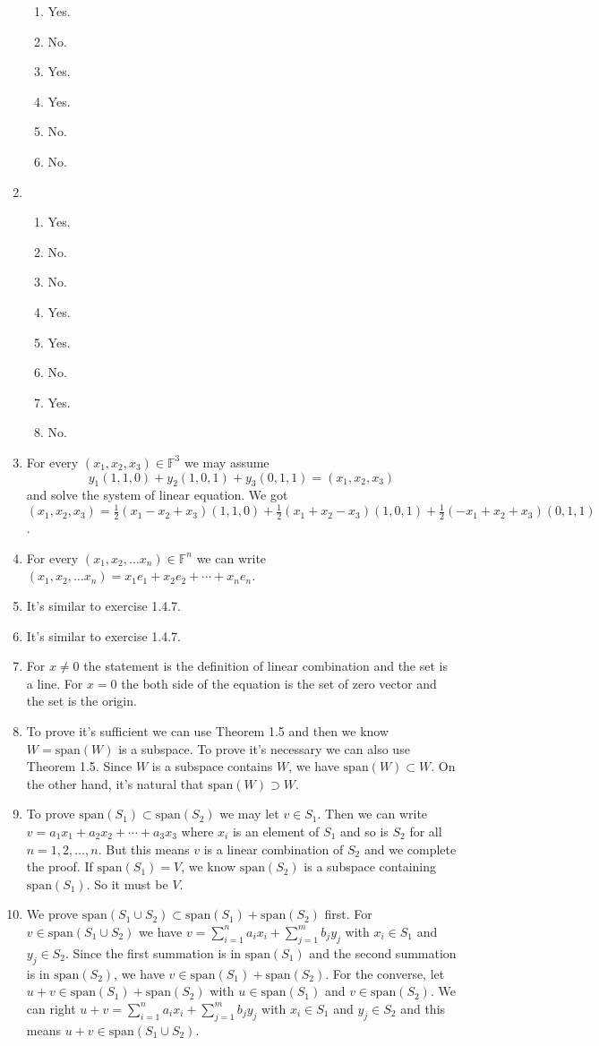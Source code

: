 \begin{enumerate}
\begin{enumerate}
\item Yes.
\item No.
\item Yes.
\item Yes.
\item No.
\item No.
\end{enumerate}
\item \begin{enumerate}
\item Yes.
\item No.
\item No.
\item Yes.
\item Yes.
\item No.
\item Yes.
\item No.
\end{enumerate}
\item For every $(x_1,x_2,x_3)\in \mathbb{F}^3$ we may assume \[y_1(1,1,0)+y_2(1,0,1)+y_3(0,1,1)=(x_1,x_2,x_3)\] and solve the system of linear equation. We got $(x_1,x_2,x_3)=\frac{1}{2}(x_1-x_2+x_3)(1,1,0)+\frac{1}{2}(x_1+x_2-x_3)(1,0,1)+\frac{1}{2}(-x_1+x_2+x_3)(0,1,1)$.
\item For every $(x_1,x_2,\dots x_n)\in \mathbb{F}^n$ we can write $(x_1,x_2,\dots x_n)=x_1e_1+x_2e_2+\cdots +x_ne_n$.
\item It's similar to exercise 1.4.7.
\item It's similar to exercise 1.4.7.
\item For $x\neq 0$ the statement is the definition of linear combination and the set is a line. For $x=0$ the both side of the equation is the set of zero vector and the set is the origin.
\item To prove it's sufficient we can use Theorem 1.5 and then we know $W=\mathrm{span}(W)$ is a subspace. To prove it's necessary we can also use Theorem 1.5. Since $W$ is a subspace contains $W$, we have $\mathrm{span}(W)\subset W$. On the other hand, it's natural that $\mathrm{span}(W)\supset W$.
\item To prove $\mathrm{span}(S_1)\subset \mathrm{span}(S_2)$ we may let $v\in S_1$. Then we can write $v=a_1x_1+a_2x_2+\cdots +a_3x_3$ where $x_i$ is an element of $S_1$ and so is $S_2$ for all $n=1,2,\dots,n$. But this means $v$ is a linear combination of $S_2$ and we complete the proof. If $\mathrm{span}(S_1)=V$, we know $\mathrm{span}(S_2)$ is a subspace containing $\mathrm{span}(S_1)$. So it must be $V$.
\item We prove $\mathrm{span}(S_1\cup S_2)\subset \mathrm{span}(S_1)+\mathrm{span}(S_2)$ first. For $v\in \mathrm{span}(S_1\cup S_2)$ we have $v=\sum_{i=1}^n{a_ix_i}+\sum_{j=1}^m{b_jy_j}$ with $x_i\in S_1$ and $y_j \in S_2$. Since the first summation is in $\mathrm{span}(S_1)$ and the second summation is in $\mathrm{span}(S_2)$, we have $v\in \mathrm{span}(S_1)+\mathrm{span}(S_2)$. For the converse, let $u+v\in \mathrm{span}(S_1)+\mathrm{span}(S_2)$ with $u\in \mathrm{span}(S_1)$ and $v\in \mathrm{span}(S_2)$. We can right $u+v=\sum_{i=1}^n{a_ix_i}+\sum_{j=1}^m{b_jy_j}$ with $x_i\in S_1$ and $y_j \in S_2$ and this means $u+v\in \mathrm{span}(S_1\cup S_2)$.

\end{enumerate}

